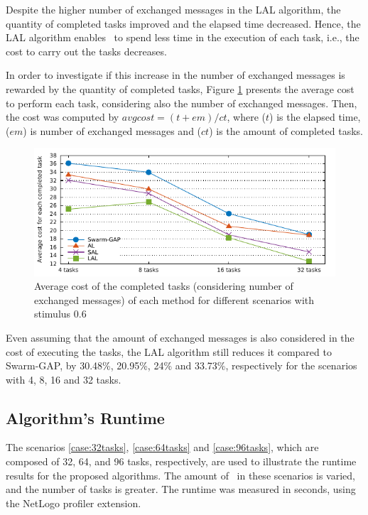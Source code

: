 Despite the higher number of exchanged messages in the LAL algorithm, the quantity of completed tasks improved and the elapsed time decreased. Hence, the LAL algorithm enables \uavs\ to spend less time in the execution of each task, i.e., the cost to carry out the tasks decreases.

In order to investigate if this increase in the number of exchanged messages is rewarded by the quantity of completed tasks, Figure \ref{grafico:custoportarefa} presents the average cost to perform each task, considering also the number of exchanged messages. 
Then, the cost was computed by $avgcost = (t + em) / ct$, where ($t$) is the elapsed time, ($em$) is number of exchanged messages and ($ct$) is the amount of completed tasks.

%
\begin{figure}[h!]
	\begin{center}
		\includegraphics[scale=1.00]{avgcost.pdf}
		\caption{Average cost of the completed tasks (considering number of exchanged messages) of each method for different scenarios  with stimulus 0.6}
		\label{grafico:custoportarefa}
	\end{center}
\end{figure}

Even assuming that the amount of exchanged messages is also considered in the cost of executing the tasks, the LAL algorithm still reduces it compared to Swarm-GAP, by 30.48\%, 20.95\%, 24\% and 33.73\%, respectively for the scenarios with 4, 8, 16 and 32 tasks. 
 

\subsection{Algorithm's Runtime} \label{sec:runtime}

The scenarios \ref{case:32tasks}, \ref{case:64tasks} and \ref{case:96tasks}, which are composed of 32, 64, and 96 tasks, respectively, are used to illustrate the runtime results for the proposed algorithms.
The amount of \uavs\ in these scenarios is varied, and the number of tasks is greater. The runtime was measured in seconds, using the NetLogo profiler extension. 

